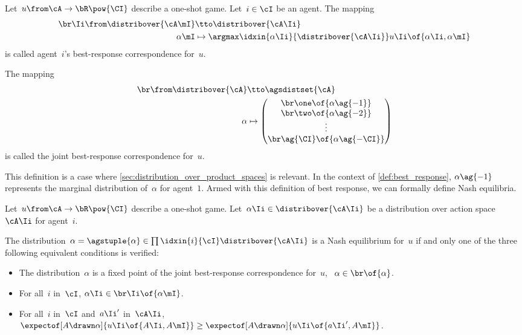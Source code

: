 \begin{definition}
\label{def:best_response}
Let~\(u \from \cA \to \bR\pow{\CI}\) describe a one-shot game.
Let~\(i \in \cI\) be an agent.
The mapping
\[
\begin{aligned}
\br\Ii \from \distribover{\cA\mI} &\tto \distribover{\cA\Ii} \\
\alpha\mI &\mapsto \argmax\idxin{\alpha\Ii}{\distribover{\cA\Ii}} u\Ii \of {\alpha\Ii, \alpha\mI}
\end{aligned}
\]
is called agent~\(i\)'s best-response correspondence for~\(u\).

The mapping
\[
\begin{aligned}
\br \from \distribover{\cA} &\tto \agsdistset{\cA} \\
\alpha &\mapsto
\begin{pmatrix}
\br\one \of{\alpha\ag{-1}} \\
\br\two \of{\alpha\ag{-2}} \\
\vdots \\
\br\ag{\CI} \of{\alpha\ag{-\CI}}
\end{pmatrix}
\end{aligned}
\]
is called the joint best-response correspondence for~\(u\).

\end{definition}

This definition is a case where \cref{sec:distribution_over_product_spaces} is relevant.
In the context of \cref{def:best_response}, \(\alpha\ag{-1}\) represents the marginal distribution of~\(\alpha\) for agent~\(1\).
Armed with this definition of best response, we can formally define Nash equilibria.

\begin{definition}
\label{def:nash_equilibrium}
Let~\(u \from \cA \to \bR\pow{\CI}\) describe a one-shot game.
Let~\(\alpha\Ii \in \distribover{\cA\Ii}\) be a distribution over action space~\(\cA\Ii\) for agent~\(i\).

The distribution~\(\alpha = \agstuple{\alpha} \in \prod\idxin{i}{\cI} \distribover{\cA\Ii}\) is a Nash equilibrium for~\(u\) if and only one of the three following equivalent conditions is verified:
\begin{itemize}
\item The distribution~\(\alpha\) is a fixed point of the joint best-response correspondence for~\(u\), \ie~\(\alpha \in \br \of{\alpha}\).
\item For all~\(i\) in~\(\cI\), \(\alpha\Ii \in \br\Ii \of {\alpha\mI}\).
\item For all~\(i\) in~\(\cI\) and~\(a\Ii'\) in~\(\cA\Ii\),
\(\expectof[A \drawn \alpha]{u\Ii \of{A\Ii, A\mI}}
\ge
\expectof[A \drawn \alpha]{u\Ii \of{a\Ii', A\mI}}
\).
\end{itemize}
\end{definition}

